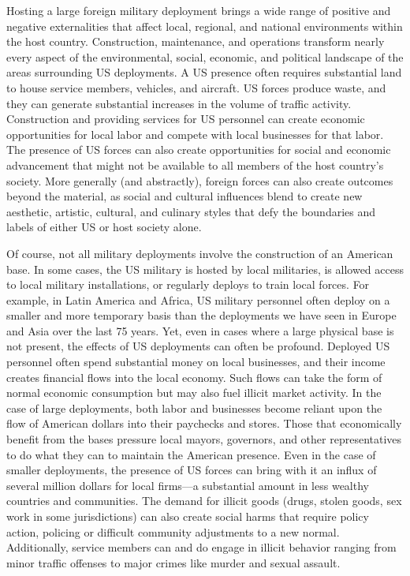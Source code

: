 Hosting a large foreign military deployment brings a wide range of positive and negative externalities that affect local, regional, and national environments within the host country. Construction, maintenance, and operations transform nearly every aspect of the environmental, social, economic, and political landscape of the areas surrounding US deployments. A US presence often requires substantial land to house service members, vehicles, and aircraft. US forces produce waste, and they can generate substantial increases in the volume of traffic activity. Construction and providing services for US personnel can create economic opportunities for local labor and compete with local businesses for that labor. The presence of US forces can also create opportunities for social and economic advancement that might not be available to all members of the host country's society. More generally (and abstractly), foreign forces can also create outcomes beyond the material, as social and cultural influences blend to create new aesthetic, artistic, cultural, and culinary styles that defy the boundaries and labels of either US or host society alone.

Of course, not all military deployments involve the construction of an American base. In some cases, the US military is hosted by local militaries, is allowed access to local military installations, or regularly deploys to train local forces. For example, in Latin America and Africa, US military personnel often deploy on a smaller and more temporary basis than the deployments we have seen in Europe and Asia over the last 75 years. Yet, even in cases where a large physical base is not present, the effects of US deployments can often be profound. Deployed US personnel often spend substantial money on local businesses, and their income creates financial flows into the local economy. Such flows can take the form of normal economic consumption but may also fuel illicit market activity. In the case of large deployments, both labor and businesses become reliant upon the flow of American dollars into their paychecks and stores. Those that economically benefit from the bases pressure local mayors, governors, and other representatives to do what they can to maintain the American presence. Even in the case of smaller deployments, the presence of US forces can bring with it an influx of several million dollars for local firms---a substantial amount in less wealthy countries and communities. The demand for illicit goods (drugs, stolen goods, sex work in some jurisdictions) can also create social harms that require policy action, policing or difficult community adjustments to a new normal. Additionally, service members can and do engage in illicit behavior ranging from minor traffic offenses to major crimes like murder and sexual assault. 

